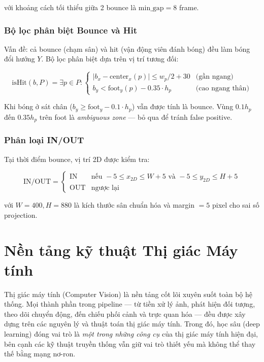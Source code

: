\documentclass[12pt,a4paper]{article}
\begin{document}
với khoảng cách tối thiểu giữa 2 bounce là $\text{min\_gap} = 8$ frame.

\subsubsection{Bộ lọc phân biệt Bounce và Hit}
\label{sec:bounce_hit}
Vấn đề: cả bounce (chạm sân) và hit (vận động viên đánh bóng) đều làm bóng đổi hướng $Y$. Bộ lọc phân biệt dựa trên vị trí tương đối:

\begin{equation}
\text{isHit}(b, P) = \exists p \in P: \begin{cases}
    |b_x - \text{center}_x(p)| \leq w_p/2 + 30 & \text{(gần ngang)} \\
    b_y < \text{foot}_y(p) - 0.35 \cdot h_p & \text{(cao ngang thân)}
\end{cases}
\end{equation}

Khi bóng ở sát chân ($b_y \geq \text{foot}_y - 0.1 \cdot h_p$) vẫn được tính là bounce. Vùng $0.1h_p$ đến $0.35h_p$ trên foot là \textit{ambiguous zone} --- bỏ qua để tránh false positive.

\subsubsection{Phân loại IN/OUT}
Tại thời điểm bounce, vị trí 2D được kiểm tra:

\begin{equation}
\text{IN/OUT} = \begin{cases}
    \text{IN} & \text{nếu } -5 \leq x_{2D} \leq W+5 \text{ và } -5 \leq y_{2D} \leq H+5 \\
    \text{OUT} & \text{ngược lại}
\end{cases}
\end{equation}

với $W = 400, H = 880$ là kích thước sân chuẩn hóa và margin $= 5$ pixel cho sai số projection.

\section{Nền tảng kỹ thuật Thị giác Máy tính}
\label{sec:cv_techniques}

Thị giác máy tính (Computer Vision) là nền tảng cốt lõi xuyên suốt toàn bộ hệ thống. Mọi thành phần trong pipeline --- từ tiền xử lý ảnh, phát hiện đối tượng, theo dõi chuyển động, đến chiếu phối cảnh và trực quan hóa --- đều được xây dựng trên các nguyên lý và thuật toán thị giác máy tính. Trong đó, học sâu (deep learning) đóng vai trò là \textit{một trong những công cụ} của thị giác máy tính hiện đại, bên cạnh các kỹ thuật truyền thống vẫn giữ vai trò thiết yếu mà không thể thay thế bằng mạng nơ-ron.
\end{document}
